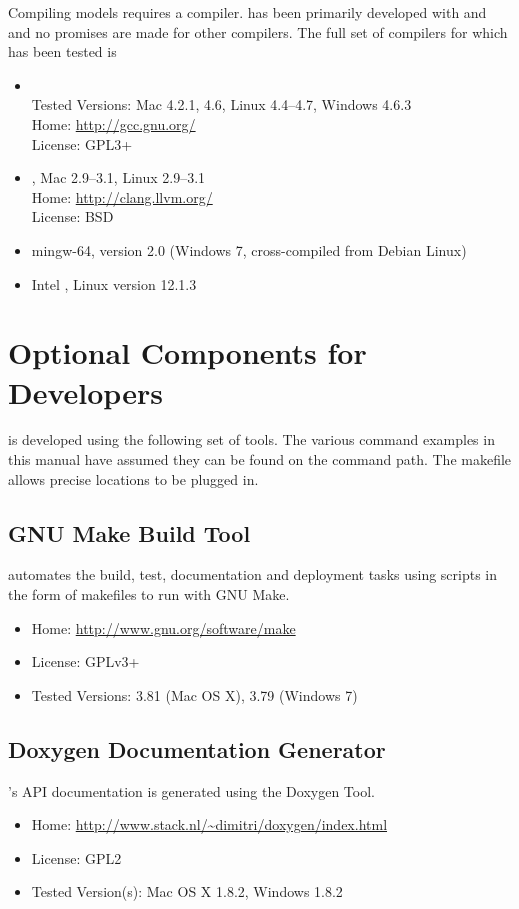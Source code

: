 Compiling \Stan models requires a \Cpp compiler.  \Stan has been
primarily developed with \clang and \gpp and no promises are made for
other compilers.  The full set of compilers for which \Stan has been
tested is
%
\begin{itemize}
%
\item \gpp
\\
Tested Versions: Mac 4.2.1, 4.6, Linux 4.4--4.7, Windows 4.6.3
\\
Home: \url{http://gcc.gnu.org/}
\\
License: GPL3+
%
\item \clang, Mac 2.9--3.1, Linux 2.9--3.1
\\
Home: \url{http://clang.llvm.org/}
\\
License: BSD
%
\item mingw-64, version 2.0 (Windows 7, cross-compiled from Debian Linux)
%
\item Intel \Cpp, Linux version 12.1.3
%
\end{itemize}
%

\section{Optional Components for Developers}

\Stan is developed using the following set of tools.  The various
command examples in this manual have assumed they can be found on
the command path.  The makefile allows precise locations to be plugged
in. 

\subsection{GNU Make Build Tool}

\Stan automates the build, test, documentation and deployment tasks
using scripts in the form of makefiles to run with GNU Make.
%
\begin{itemize}
\item Home: \url{http://www.gnu.org/software/make}
\item License: GPLv3+
\item Tested Versions: 3.81 (Mac OS X), 3.79 (Windows 7)
\end{itemize}
%


\subsection{Doxygen Documentation Generator}

\Stan's API documentation is generated using the Doxygen Tool.
%
\begin{itemize}
\item Home: \url{http://www.stack.nl/~dimitri/doxygen/index.html}
\item License: GPL2
\item Tested Version(s): Mac OS X 1.8.2, Windows 1.8.2
\end{itemize}


